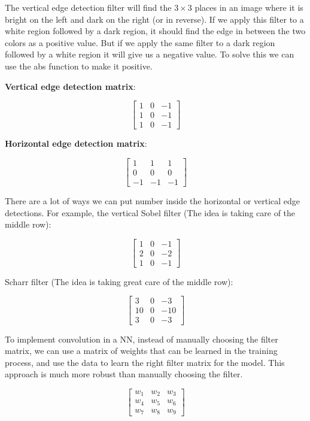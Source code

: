 \documentclass{article}
\begin{document}
\noindent The vertical edge detection filter will find the \(3 \times 3\) places in an image where it is bright on the left and dark on the right (or in reverse). If we apply this filter to a white region followed by a dark region, it should find the edge in between the two colors as a positive value. But if we apply the same filter to a dark region followed by a white region it will give us a negative value. To solve this we can use the abs function to make it positive.

\bigskip

\noindent \textbf{Vertical edge detection matrix}:

\[
\begin{bmatrix}
1 & 0 & -1\\
1 & 0 & -1\\
1 & 0 & -1
\end{bmatrix}
\]

\noindent \textbf{Horizontal edge detection matrix}:

\[
\begin{bmatrix}
1 & 1 & 1\\
0 & 0 & 0\\
-1 & -1 & -1
\end{bmatrix}
\]

\noindent There are a lot of ways we can put number inside the horizontal or vertical edge detections. For example, the vertical Sobel filter (The idea is taking care of the middle row):

\[
\begin{bmatrix}
1 & 0 & -1\\
2 & 0 & -2\\
1 & 0 & -1
\end{bmatrix}
\]

\noindent Scharr filter (The idea is taking great care of the middle row):

\[
\begin{bmatrix}
3 & 0 & -3\\
10 & 0 & -10\\
3 & 0 & -3
\end{bmatrix}
\]

\noindent To implement convolution in a NN, instead of manually choosing the filter matrix, we can use a matrix of weights that can be learned in the training process, and use the data to learn the right filter matrix for the model. This approach is much more robust than manually choosing the filter.

\[
\begin{bmatrix}
w_{1} & w_{2} & w_{3}\\
w_{4} & w_{5} & w_{6}\\
w_{7} & w_{8} & w_{9}
\end{bmatrix}
\]

\printindex
\end{document}

